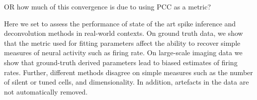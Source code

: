 \documentclass[a4paper,10pt,twocolumn]{article}
\begin{document}
OR how much of this convergence is due to using PCC as a metric?





Here we set to assess the performance of state of the art spike inference and deconvolution methods in real-world contexts. On ground truth data, we show that the metric used for fitting parameters affect the ability to recover simple measures of neural activity such as firing rate. On large-scale imaging data we show that ground-truth derived parameters lead to biased estimates of firing rates. Further, different methods disagree on simple measures such as the number of silent or tuned cells, and dimensionality. In addition, artefacts in the data are not automatically removed. 








\end{document}
